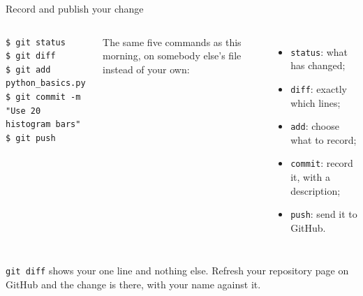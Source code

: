 \documentclass[aspectratio=169,11pt]{beamer}
\begin{document}
\begin{frame}[fragile]{Record and publish your change}
\begin{columns}[T,onlytextwidth]
\begin{lstlisting}[style=terminal]
$ git status
$ git diff
$ git add python_basics.py
$ git commit -m "Use 20 histogram bars"
$ git push
\end{lstlisting}

  The same five commands as this morning, on somebody else's file instead of
  your own:
  \begin{itemize}
    \item \texttt{status}: what has changed;
    \item \texttt{diff}: exactly which lines;
    \item \texttt{add}: choose what to record;
    \item \texttt{commit}: record it, with a description;
    \item \texttt{push}: send it to GitHub.
  \end{itemize}
\end{columns}

\vspace{0.8em}
\texttt{git diff} shows your one line and nothing else. Refresh your repository
page on GitHub and the change is there, with your name against it.
\end{frame}
\end{document}
